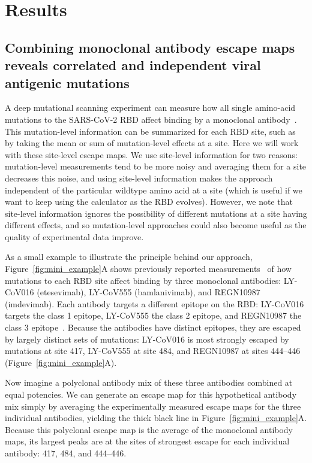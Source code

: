 \documentclass[9pt,twocolumn,twoside]{gsajnl_modified}
\begin{document}
\section{Results}

\subsection{Combining monoclonal antibody escape maps reveals correlated and independent viral antigenic mutations}
A deep mutational scanning experiment can measure how all single amino-acid mutations to the SARS-CoV-2 RBD affect binding by a monoclonal antibody~\citep{greaney2021complete}.
This mutation-level information can be summarized for each RBD site, such as by taking the mean or sum of mutation-level effects at a site.
Here we will work with these site-level escape maps.
We use site-level information for two reasons: mutation-level measurements tend to be more noisy and averaging them for a site decreases this noise, and using site-level information makes the approach independent of the particular wildtype amino acid at a site (which is useful if we want to keep using the calculator as the RBD evolves).
However, we note that site-level information ignores the possibility of different mutations at a site having different effects, and so mutation-level approaches could also become useful as the quality of experimental data improve.

As a small example to illustrate the principle behind our approach, Figure~\ref{fig:mini_example}A shows previously reported measurements~\citep{starr2021prospective, starr2021complete} of how mutations to each RBD site affect binding by three monoclonal antibodies: LY-CoV016 (etesevimab), LY-CoV555 (bamlanivimab), and REGN10987 (imdevimab).
Each antibody targets a different epitope on the RBD: LY-CoV016 targets the class 1 epitope, LY-CoV555 the class 2 epitope, and REGN10987 the class 3 epitope~\citep{barnes2020sars,greaney2021mapping}.
Because the antibodies have distinct epitopes, they are escaped by largely distinct sets of mutations: LY-CoV016 is most strongly escaped by mutations at site 417, LY-CoV555 at site 484, and REGN10987 at sites 444--446 (Figure~\ref{fig:mini_example}A).

Now imagine a polyclonal antibody mix of these three antibodies combined at equal potencies.
We can generate an escape map for this hypothetical antibody mix simply by averaging the experimentally measured escape maps for the three individual antibodies, yielding the thick black line in Figure~\ref{fig:mini_example}A.
Because this polyclonal escape map is the average of the monoclonal antibody maps, its largest peaks are at the sites of strongest escape for each individual antibody: 417, 484, and 444--446.
\end{document}
